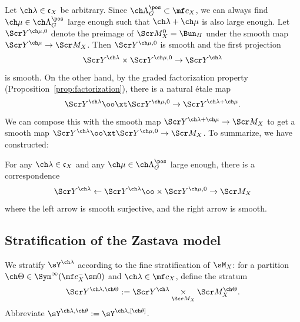 Let $\ch\lambda\in \mathfrak c_X$ be arbitrary.
Since $\ch\Lambda^\pos_G \subset \mf c_X$, we can always
find $\ch\mu \in \ch\Lambda^\pos_G$ large enough such that
$\ch\lambda+\ch\mu$ is also large enough.
Let $\Scr Y^{\ch\mu,0}$ denote the preimage of $\Scr M_X^0=\Bun_H$ under the smooth map $\Scr Y^{\ch\mu} \to \Scr M_{X}$.
Then $\Scr Y^{\ch\mu,0}$ is smooth and
the first projection
\[  \Scr Y^{\ch\lambda} \times \Scr Y^{\ch\mu,0} \to \Scr Y^{\ch\lambda} \]
is smooth.
On the other hand, by the graded factorization property (Proposition~\ref{prop:factorization}), there is a natural \'etale map
\[ \Scr Y^{\ch\lambda} \oo\xt \Scr Y^{\ch\mu,0}
\to \Scr Y^{\ch\lambda+\ch\mu}.
\]
We can compose this with the smooth map $\Scr Y^{\ch\lambda+\ch\mu}\to \Scr M_X$ to get a smooth map $\Scr Y^{\ch\lambda} \oo\xt \Scr Y^{\ch\mu,0} \to \Scr M_X$.
To summarize, we have constructed:


\begin{lem}
\notready \label{lem:localglobalyoga}
For any $\ch\lambda\in \mathfrak c_X$ and any $\ch\mu \in \ch\Lambda_G^\pos$ large enough, there is a correspondence
\[
\Scr Y^{\ch\lambda} \leftarrow
\Scr Y^{\ch\lambda} \oo\times \Scr Y^{\ch\mu,0} \rightarrow
\Scr M_{X}
\]
where the left arrow is smooth surjective, and the right arrow is smooth.
\end{lem}



\subsection{Stratification of the Zastava model}
We stratify $\sY^{\ch\lambda}$ according to the fine stratification of $\sM_X$:
for a partition $\ch\Theta \in \Sym^\infty(\mf c_X^- \sm 0)$
and $\ch\lambda\in \mf c_X$,
define the stratum
\[ \Scr Y^{\ch\lambda,\ch\Theta} := \Scr Y^{\ch\lambda}
\underset{\Scr M_X}\times \Scr M_X^{\ch\Theta}. \]
Abbreviate $\sY^{\ch\lambda,\ch\theta} := \sY^{\ch\lambda,[\ch\theta]}$.

